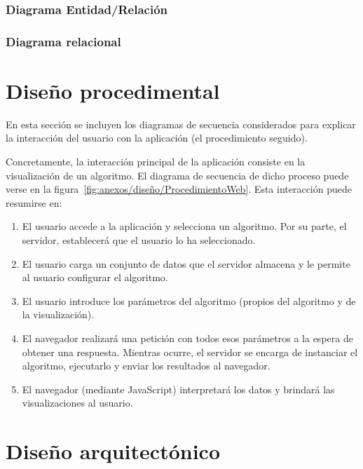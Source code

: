 \begin{landscape}
\subsubsection{Diagrama Entidad/Relación}
\end{landscape}

\subsubsection{Diagrama relacional}
\section{Diseño procedimental}
En esta sección se incluyen los diagramas de secuencia considerados para
explicar la interacción del usuario con la aplicación (el procedimiento
seguido).

Concretamente, la interacción principal de la aplicación consiste en la
visualización de un algoritmo. El diagrama de secuencia de dicho proceso puede
verse en la figura~\ref{fig:anexos/diseño/ProcedimientoWeb}. Esta interacción
puede resumirse en:

\begin{enumerate}
    \item El usuario accede a la aplicación y selecciona un algoritmo. Por su
    parte, el servidor, establecerá que el usuario lo ha seleccionado.
    \item El usuario carga un conjunto de datos que el servidor almacena y le
    permite al usuario configurar el algoritmo.
    \item El usuario introduce los parámetros del algoritmo (propios del
    algoritmo y de la visualización).
    \item El navegador realizará una petición con todos esos parámetros a la
    espera de obtener una respuesta. Mientras ocurre, el servidor se encarga de
    instanciar el algoritmo, ejecutarlo y enviar los resultados al navegador.
    \item El navegador (mediante JavaScript) interpretará los datos y brindará
    las visualizaciones al usuario.
\end{enumerate}


\section{Diseño arquitectónico}

